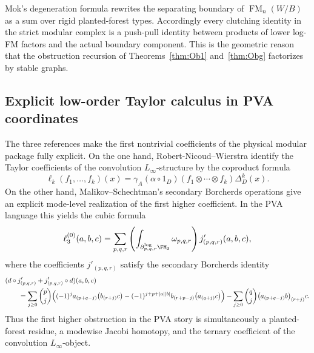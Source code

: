\begin{remark}
\label{rem:vol2-rigid-type-boundary-factorization}
Mok's degeneration formula rewrites the separating boundary of
$\operatorname{FM}_n(W/B)$ as a sum over rigid planted-forest types.
Accordingly every clutching identity in the strict modular complex is a
push-pull identity between products of lower log-FM factors and the actual
boundary component.  This is the geometric reason that the obstruction
recursion of Theorems~\ref{thm:Ob1} and~\ref{thm:Obg} factorizes by stable
graphs.
\end{remark}


\subsection{Explicit low-order Taylor calculus in PVA coordinates}
\label{subsec:vol2-explicit-low-order-taylor-calculus}

The three references make the first nontrivial coefficients of the physical modular package fully explicit.
On the one hand, Robert-Nicoud--Wierstra identify the Taylor coefficients of the convolution
$L_\infty$-structure by the coproduct formula
\[
\ell_k(f_1,\dots,f_k)(x)
=
\gamma_A(\alpha\circ 1_D)(f_1\otimes\cdots\otimes f_k)\Delta_D^k(x).
\]
On the other hand, Malikov--Schechtman's secondary Borcherds operations give an explicit mode-level
realization of the first higher coefficient.  In the PVA language this yields the cubic formula
\begin{equation}
\label{eq:vol2-explicit-l3-secondary-borcherds}
\ell_3^{(0)}(a,b,c)
=
\sum_{p,q,r}
\left(
\int_{\partial^{\log}_{p,q,r}\FM_3} \omega_{p,q,r}
\right)
 j'_{(p,q,r)}(a,b,c),
\end{equation}
where the coefficients $j'_{(p,q,r)}$ satisfy the secondary Borcherds identity
\begin{align}
\label{eq:vol2-secondary-borcherds-identity}
&(d\circ j'_{(p,q,r)}+j'_{(p,q,r)}\circ d)(a,b,c)
\notag\\
&\qquad=
\sum_{j\ge 0}\binom{p}{j}
\Bigl(
(-1)^j a_{(p+q-j)}\bigl(b_{(r+j)}c\bigr)
-(-1)^{j+p+|a||b|}b_{(r+p-j)}\bigl(a_{(q+j)}c\bigr)
\Bigr)
-\sum_{j\ge 0}\binom{q}{j}\bigl(a_{(p+q-j)}b\bigr)_{(r+j)}c.
\end{align}
Thus the first higher obstruction in the PVA story is simultaneously a planted-forest residue, a modewise
Jacobi homotopy, and the ternary coefficient of the convolution $L_\infty$-object.

